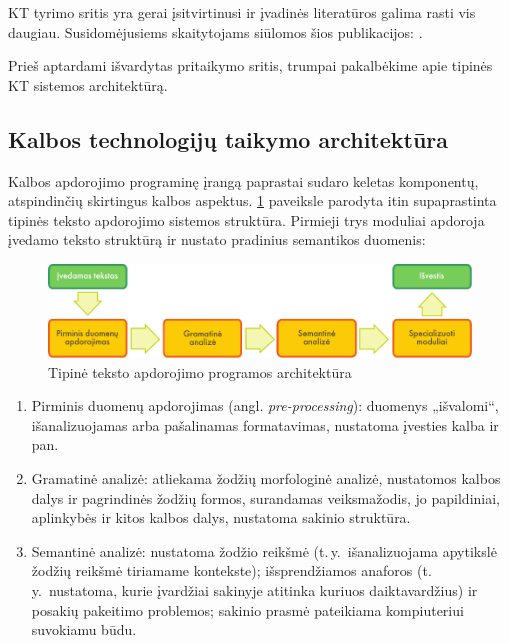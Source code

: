 \begin{multicols}{2}
KT tyrimo sritis yra gerai įsitvirtinusi ir įvadinės literatūros galima rasti vis daugiau. Susidomėjusiems skaitytojams siūlomos šios publikacijos:  \cite{carstensen-etal1, jurafsky-martin01, manning-schuetze1, lt-world1, lt-survey1}.

 Prieš aptardami išvardytas pritaikymo sritis, trumpai pakalbėkime apie tipinės KT sistemos architektūrą.  

\subsection{Kalbos technologijų taikymo architektūra}

Kalbos apdorojimo programinę įrangą paprastai sudaro keletas komponentų, atspindinčių skirtingus kalbos aspektus.  \ref{fig:textprocessingarch_de} paveiksle parodyta itin supaprastinta tipinės teksto apdorojimo sistemos struktūra. Pirmieji trys moduliai apdoroja įvedamo teksto struktūrą ir nustato pradinius semantikos duomenis:

\begin{figure}[htb]
  \center
  \includegraphics[width=\textwidth]{../_media/lithuanian/text_processing_app_architecture}
  \caption{Tipinė teksto apdorojimo programos architektūra}
  \label{fig:textprocessingarch_de}
\end{figure}

\begin{enumerate}
\item Pirminis duomenų apdorojimas (angl. \textit{pre-processing}):  duomenys „išvalomi“, išanalizuojamas arba pašalinamas formatavimas, nustatoma įvesties kalba ir pan.
\item Gramatinė analizė: atliekama žodžių morfologinė analizė, nustatomos kalbos dalys ir pagrindinės žodžių formos, surandamas veiksmažodis, jo papildiniai, aplinkybės ir kitos kalbos dalys, nustatoma sakinio struktūra.
\item Semantinė analizė: nustatoma žodžio reikšmė (t.\,y.~išanalizuojama apytikslė žodžių reikšmė tiriamame kontekste); išsprendžiamos anaforos (t.\,y.~nustatoma, kurie įvardžiai sakinyje atitinka kuriuos daiktavardžius) ir posakių pakeitimo problemos; sakinio prasmė pateikiama kompiuteriui suvokiamu būdu.
\end{enumerate}


\end{multicols}
